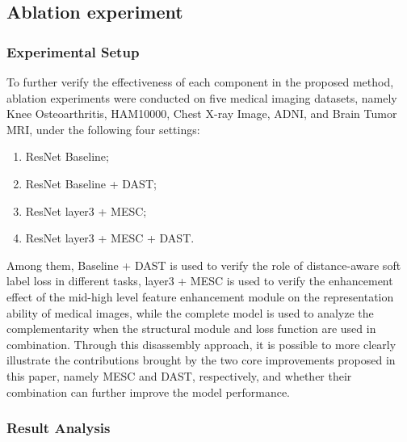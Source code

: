 \documentclass[letterpaper, 10 pt, conference]{ieeeconf}  %
\begin{document}
\subsection{Ablation experiment}
\subsubsection{Experimental Setup}

To further verify the effectiveness of each component in the proposed method, ablation experiments were conducted on five medical imaging datasets, namely Knee Osteoarthritis, HAM10000, Chest X-ray Image, ADNI, and Brain Tumor MRI, under the following four settings:
 
 \begin{enumerate}
    \item ResNet Baseline;
    \item ResNet Baseline + DAST;
    \item ResNet layer3 + MESC;
    \item ResNet layer3 + MESC + DAST.
\end{enumerate}
 
 Among them, Baseline + DAST is used to verify the role of distance-aware soft label loss in different tasks, layer3 + MESC is used to verify the enhancement effect of the mid-high level feature enhancement module on the representation ability of medical images, while the complete model is used to analyze the complementarity when the structural module and loss function are used in combination. Through this disassembly approach, it is possible to more clearly illustrate the contributions brought by the two core improvements proposed in this paper, namely MESC and DAST, respectively, and whether their combination can further improve the model performance.


\subsubsection{Result Analysis}
\end{document}
